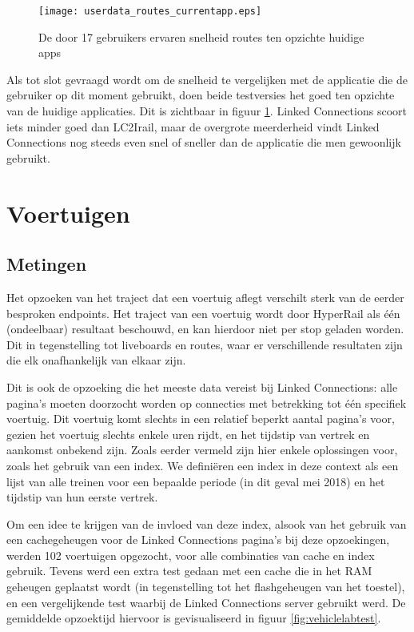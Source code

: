 \begin{figure}[ht]
	\centering
	\texttt{[image: userdata\_routes\_currentapp.eps]}
	\caption[Door gebruikers ervaren snelheid routes tov huidige apps]{De door 17 gebruikers ervaren snelheid routes ten opzichte huidige apps }
	\label{fig:relativePerceptionRoutes}
\end{figure}

Als tot slot gevraagd wordt om de snelheid te vergelijken met de applicatie die de gebruiker op dit moment gebruikt, doen beide testversies het goed ten opzichte van de huidige applicaties. Dit is zichtbaar in figuur \ref{fig:relativePerceptionRoutes}. Linked Connections scoort iets minder goed dan LC2Irail, maar de overgrote meerderheid vindt Linked Connections nog steeds even snel of sneller dan de applicatie die men gewoonlijk gebruikt.

\section{Voertuigen}

\subsection{Metingen}
Het opzoeken van het traject dat een voertuig aflegt verschilt sterk van de eerder besproken endpoints. Het traject van een voertuig wordt door HyperRail als één (ondeelbaar) resultaat beschouwd, en kan hierdoor niet per stop geladen worden. Dit in tegenstelling tot liveboards en routes, waar er verschillende resultaten zijn die elk onafhankelijk van elkaar zijn.

Dit is ook de opzoeking die het meeste data vereist bij Linked Connections: alle pagina's moeten doorzocht worden op connecties met betrekking tot één specifiek voertuig. Dit voertuig komt slechts in een relatief beperkt aantal pagina's voor, gezien het voertuig slechts enkele uren rijdt, en het tijdstip van vertrek en aankomst onbekend zijn. Zoals eerder vermeld %
zijn hier enkele oplossingen voor, zoals het gebruik van een index. We definiëren een index in deze context als een lijst van alle treinen voor een bepaalde periode (in dit geval mei 2018) en het tijdstip van hun eerste vertrek.

Om een idee te krijgen van de invloed van deze index, alsook van het gebruik van een cachegeheugen voor de Linked Connections pagina's bij deze opzoekingen, werden 102 voertuigen opgezocht, voor alle combinaties van cache en index gebruik. Tevens werd een extra test gedaan met een cache die in het RAM geheugen geplaatst wordt (in tegenstelling tot het flashgeheugen van het toestel), en een vergelijkende test waarbij de Linked Connections server gebruikt werd. De gemiddelde opzoektijd hiervoor is gevisualiseerd in figuur \ref{fig:vehiclelabtest}.

